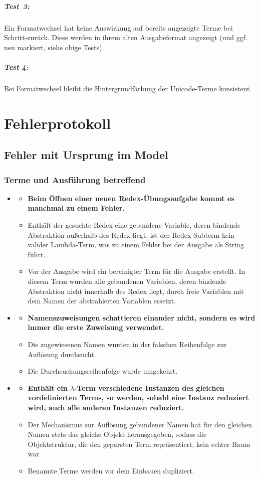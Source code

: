 \documentclass[parskip=full,11pt,openany]{scrreprt}
\begin{document}
\paragraph{Test\, 3:} Ein Formatwechsel hat keine Auswirkung auf bereits angezeigte Terme bei Schritt-zurück. Diese werden in ihrem alten Ausgabeformat angezeigt (und ggf. neu markiert, siehe obige Tests).

\paragraph{Test 4:} Bei Formatwechsel bleibt die Hintergrundfärbung der Unicode-Terme konsistent.


\chapter{Fehlerprotokoll}

\newcommand{\issue}[3]{%
	\item[]
	\begin{itemize}[noitemsep]
		\item[]\textbf{#1}
		\item[\textbf{Grund:}]#2
		\item[\textbf{Behebung:}]#3
\end{itemize}}

\section{Fehler mit Ursprung im Model}

\subsection{Terme und Ausführung betreffend}
\begin{itemize}[itemsep=3ex]
	\issue{Beim Öffnen einer neuen Redex-Übungsaufgabe kommt es manchmal zu einem Fehler.}
	{Enthält der gesuchte Redex eine gebundene Variable, deren bindende Abstraktion außerhalb des Redex liegt, ist der Redex-Subterm kein valider Lambda-Term, was zu einem Fehler bei der Ausgabe als String führt.}
	{Vor der Ausgabe wird ein bereinigter Term für die Ausgabe erstellt. In diesem Term wurden alle gebundenen Variablen, deren bindende Abstraktion nicht innerhalb des Redex liegt, durch freie Variablen mit dem Namen der abstrahierten Variablen ersetzt.}
	
	\issue{Namenszuweisungen schattieren einander nicht, sondern es wird immer die erste Zuweisung verwendet.}
	{Die zugewiesenen Namen wurden in der falschen Reihenfolge zur Auflösung durchsucht.}
	{Die Durchsuchungsreihenfolge wurde umgekehrt.}
	
	\issue{Enthält ein $\lambda$-Term verschiedene Instanzen des gleichen vordefinierten Terms, so werden, sobald eine Instanz reduziert wird, auch alle anderen Instanzen reduziert.}
	{Der Mechanismus zur Auflösung gebundener Namen hat für den gleichen Namen stets das gleiche Objekt
		herausgegeben, sodass die Objektstruktur, die den geparsten Term repräsentiert, kein echter Baum war.}
	{Benannte Terme werden vor dem Einbauen dupliziert.}
\end{itemize}
\end{document}
